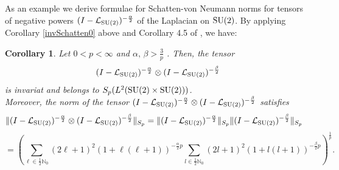 \documentclass[a4paper,12pt,reqno]{amsart}
\newtheorem{cor}[thm]{Corollary}
\theoremstyle{definition}
\theoremstyle{remark}
\numberwithin{equation}{section}
\newcommand{\ene}{\mathbb{N}}
\DeclareMathOperator{\Tr}{Tr}
\def\SU2{{{\rm SU(2)}}}
\def\lapsu2{{{\mathcal L}_\SU2}}
\def\lapsu2{{{\mathcal L}_\SU2}}
\DeclareMathOperator{\Hi}{{\bf H}}
\begin{document}











As an example we derive formulae for Schatten-von Neumann norms for tensors of negative powers $(I-\mathcal{L}_{\SU2})^{-\frac{\alpha}{2}}$ of the Laplacian on $\SU2$. By applying  Corollary \ref{invSchatten0} above and Corollary 4.5 of \cite{dr13:schatten}, we have: %

\begin{cor}\label{COR:su2-Lap}%
Let $0<p<\infty$ and  $\alpha,\, \beta> \frac{3}{p}$ . Then, the tensor 
\[(I-\lapsu2)^{-\frac{\alpha}{2}}\otimes (I-\lapsu2)^{-\frac{\beta}{2}}\]
is invariat and belongs to $S_p(L^2(\SU2\times\SU2))$.\\

Moreover, the norm of the tensor $(I-\lapsu2)^{-\frac{\alpha}{2}}\otimes (I-\lapsu2)^{-\frac{\beta}{2}}$ satisfies
\begin{align*}
\|(I-\lapsu2)^{-\frac{\alpha}{2}}\otimes (I-\lapsu2)^{-\frac{\beta}{2}}\|_{S_p}&=\|(I-\lapsu2)^{-\frac{\alpha}{2}}\|_{S_p}\|(I-\lapsu2)^{-\frac{\beta}{2}}\|_{S_p} 
\end{align*}
\[=\left( \sum\limits_{\ell\in\frac{1}{2}\ene_0}(2\ell+1)^2(1+\ell(\ell+1))^{-\frac{\alpha}{2}p} \sum\limits_{l\in\frac{1}{2}\ene_0}(2l+1)^2(1+l(l+1))^{-\frac{\beta}{2}p}\right)^{\frac{1}{p}}.\]

\end{cor}
\end{document}
